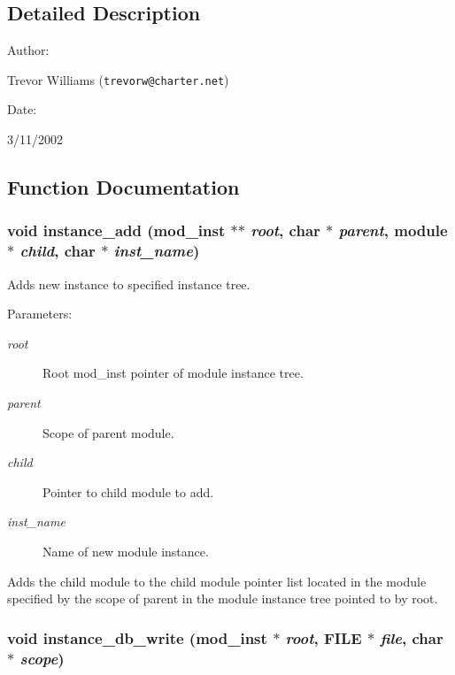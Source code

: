 \subsection{Detailed Description}


\begin{Desc}
\item[Author: ]\par
Trevor Williams ({\tt trevorw@charter.net}) \end{Desc}
\begin{Desc}
\item[Date: ]\par
3/11/2002\end{Desc}


\subsection{Function Documentation}
\subsubsection{\setlength{\rightskip}{0pt plus 5cm}void instance\_\-add ({\bf mod\_\-inst} $\ast$$\ast$ {\em root}, char $\ast$ {\em parent}, {\bf module} $\ast$ {\em child}, char $\ast$ {\em inst\_\-name})}\label{instance_8c_a1}


Adds new instance to specified instance tree.

\begin{Desc}
\item[Parameters: ]\par
\begin{description}
\item[{\em 
root}]Root mod\_\-inst pointer of module instance tree. \item[{\em 
parent}]Scope of parent module. \item[{\em 
child}]Pointer to child module to add. \item[{\em 
inst\_\-name}]Name of new module instance.\end{description}
\end{Desc}
Adds the child module to the child module pointer list located in the module specified by the scope of parent in the module instance tree pointed to by root. 
\subsubsection{\setlength{\rightskip}{0pt plus 5cm}void instance\_\-db\_\-write ({\bf mod\_\-inst} $\ast$ {\em root}, FILE $\ast$ {\em file}, char $\ast$ {\em scope})}\label{instance_8c_a2}


